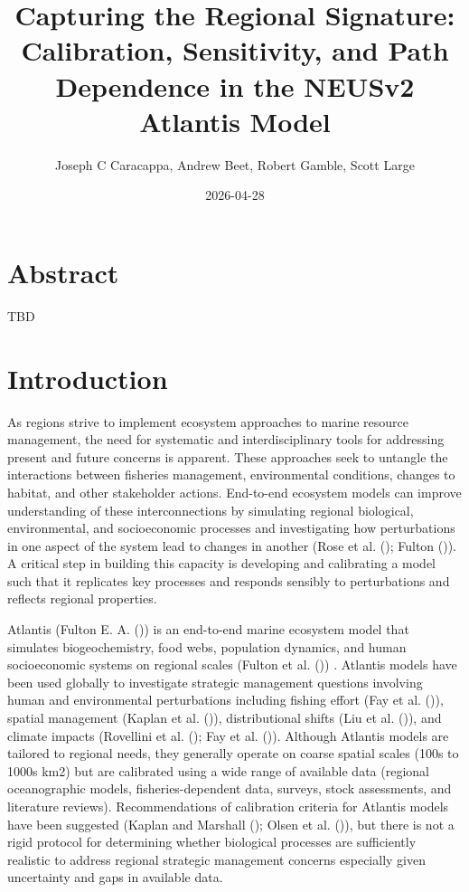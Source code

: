 \documentclass[
]{article}
\title{Capturing the Regional Signature: Calibration, Sensitivity, and Path Dependence in the NEUSv2 Atlantis Model}
\author{Joseph C Caracappa, Andrew Beet, Robert Gamble, Scott Large}
\date{2026-04-28}
\begin{document}
\maketitle

\section{Abstract}\label{abstract}

TBD

\section{Introduction}\label{introduction}

As regions strive to implement ecosystem approaches to marine resource management, the need for systematic and interdisciplinary tools for addressing present and future concerns is apparent. These approaches seek to untangle the interactions between fisheries management, environmental conditions, changes to habitat, and other stakeholder actions. End-to-end ecosystem models can improve understanding of these interconnections by simulating regional biological, environmental, and socioeconomic processes and investigating how perturbations in one aspect of the system lead to changes in another (Rose et al. (); Fulton ()). A critical step in building this capacity is developing and calibrating a model such that it replicates key processes and responds sensibly to perturbations and reflects regional properties.

Atlantis (Fulton E. A. ()) is an end-to-end marine ecosystem model that simulates biogeochemistry, food webs, population dynamics, and human socioeconomic systems on regional scales (Fulton et al. ()) . Atlantis models have been used globally to investigate strategic management questions involving human and environmental perturbations including fishing effort (Fay et al. ()), spatial management (Kaplan et al. ()), distributional shifts (Liu et al. ()), and climate impacts (Rovellini et al. (); Fay et al. ()). Although Atlantis models are tailored to regional needs, they generally operate on coarse spatial scales (100s to 1000s km2) but are calibrated using a wide range of available data (regional oceanographic models, fisheries-dependent data, surveys, stock assessments, and literature reviews). Recommendations of calibration criteria for Atlantis models have been suggested (Kaplan and Marshall (); Olsen et al. ()), but there is not a rigid protocol for determining whether biological processes are sufficiently realistic to address regional strategic management concerns especially given uncertainty and gaps in available data.
\end{document}
